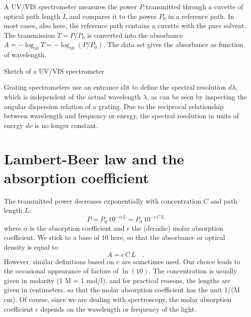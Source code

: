 A UV/VIS spectrometer measures the  power $P$ transmitted through a cuvette of optical path length $L$ and compares it to the power $P_0$ in a reference path. In most cases, also here, the reference path contains a cuvette with  the pure solvent. The transmission $T = P / P_0$ is converted into the absorbance $A = - \log_{10} T = - \log_{10} ( P / P_0)$. The data set gives the absorbance as function of wavelength.

\begin{marginfigure}
\caption{Sketch of a UV/VIS spectrometer}
\end{marginfigure}



Grating spectrometers use an entrance slit to define the spectral resolution $d \lambda$, which is independent of the actual wavelength $\lambda$, as can be seen by inspecting the angular dispersion relation of a grating. Due to the reciprocal relationship between wavelength and frequency or energy, the spectral resolution in units of energy $d \nu$ is no longer constant.




\section{Lambert-Beer law and the absorption coefficient}

The transmitted power decreases exponentially with concentration $C$ and path length $L$:
\begin{equation}
 P =  P_0 \, 10^{- \alpha \, L} = P_0 \, 10^{- \epsilon\, C \, L}
\end{equation}
where $\alpha$ is the absorption coefficient and $\epsilon$  the (decadic) molar absorption coefficient. We stick to a base of $10$ here, 
so that the absorbance or optical density is equal to 
\begin{equation}
 A = \epsilon\, C \, L \quad.
\end{equation}
However, similar definitions based on $e$ are sometimes used. Our choice leads to the occasional appearance of factors of $\ln(10)$. The concentration is usually given in molarity (1 M = 1 mol/l), and for practical reasons, the lengths are given in centimeters.
so that the molar absorption coefficient has the unit 1/(M cm). Of course, since we are dealing with spectroscopy, the molar absorption coefficient $\epsilon$ depends on the wavelength or frequency of the light.


